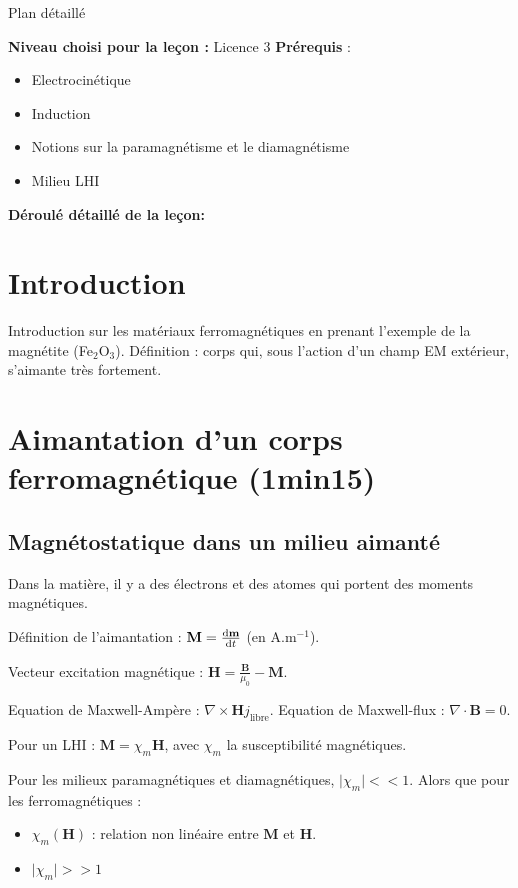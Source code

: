 \begin{reportBlock}{Plan détaillé}

  \textbf{Niveau choisi pour la leçon :} Licence 3
  \newline
  \textbf{Prérequis} : \begin{itemize}
      \item Electrocinétique
      \item Induction
      \item Notions sur la paramagnétisme et le diamagnétisme
      \item Milieu LHI
  \end{itemize}

  \textbf{Déroulé détaillé de la leçon: }  
  
  \section*{Introduction}

Introduction sur les matériaux ferromagnétiques en prenant l'exemple de la magnétite (Fe$_2$O$_3$).
Définition : corps qui, sous l'action d'un champ EM extérieur, s'aimante très fortement.

\section{Aimantation d'un corps ferromagnétique (1min15)}

\subsection{Magnétostatique dans un milieu aimanté}

Dans la matière, il y a des électrons et des atomes qui portent des moments magnétiques. 

Définition de l'aimantation : $\mathbf M = \frac{\mathrm{d} \mathbf m}{\mathrm{d} t}$ (en A.m$^{-1}$).

Vecteur excitation magnétique : $\mathbf H = \frac{\mathbf B}{\mu_0} - \mathbf M$. 

Equation de Maxwell-Ampère : $\nabla \times \mathbf H j_{\text{libre}}$.
Equation de Maxwell-flux : $\nabla \cdot \mathbf B = 0$.

Pour un LHI : $\mathbf M = \chi_m \mathbf H$, avec $\chi_m$ la susceptibilité magnétiques.

Pour les milieux paramagnétiques et diamagnétiques, $\mid\chi_m \mid << 1$. Alors que pour les ferromagnétiques : 
\begin{itemize}
    \item $\chi_m(\mathbf H)$ : relation non linéaire entre $\mathbf M$ et $\mathbf H$.
    \item $\mid\chi_m \mid >> 1$
\end{itemize}


\end{reportBlock}
